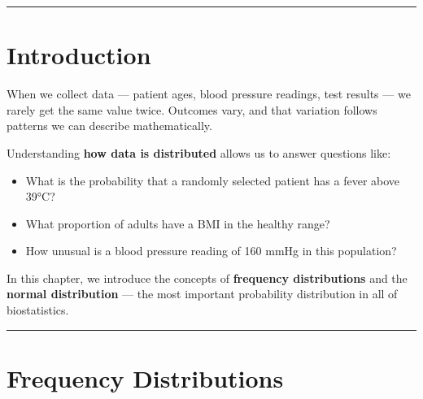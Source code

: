 \documentclass[
  12pt,
  letterpaper,
]{book}
\providecommand{\tightlist}{%
  \setlength{\itemsep}{0pt}\setlength{\parskip}{0pt}}
\begin{document}
\begin{center}\rule{0.5\linewidth}{0.5pt}\end{center}


\chapter*{Introduction}\label{introduction-2}


\begin{tcolorbox}[enhanced jigsaw, arc=.35mm, bottomrule=.15mm, bottomtitle=1mm, breakable, colback=white, colbacktitle=quarto-callout-note-color!10!white, colframe=quarto-callout-note-color-frame, coltitle=black, left=2mm, leftrule=.75mm, opacityback=0, opacitybacktitle=0.6, rightrule=.15mm, title={💡 Why Does This Matter?}, titlerule=0mm, toprule=.15mm, toptitle=1mm]

When we collect data --- patient ages, blood pressure readings, test
results --- we rarely get the same value twice. Outcomes vary, and that
variation follows patterns we can describe mathematically.

Understanding \textbf{how data is distributed} allows us to answer
questions like:

\begin{itemize}
\tightlist
\item
  What is the probability that a randomly selected patient has a fever
  above 39°C?
\item
  What proportion of adults have a BMI in the healthy range?
\item
  How unusual is a blood pressure reading of 160 mmHg in this
  population?
\end{itemize}

In this chapter, we introduce the concepts of \textbf{frequency
distributions} and the \textbf{normal distribution} --- the most
important probability distribution in all of biostatistics.

\end{tcolorbox}

\begin{center}\rule{0.5\linewidth}{0.5pt}\end{center}


\chapter{Frequency Distributions}\label{frequency-distributions}
\end{document}
